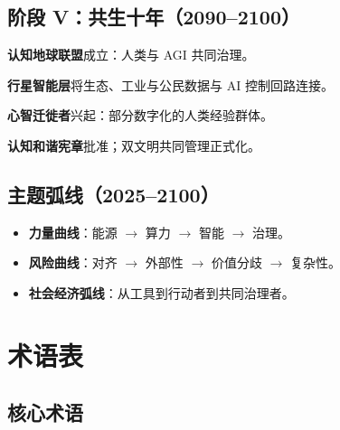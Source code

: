 \documentclass[11pt]{article}
\begin{document}
\subsection{阶段 V：共生十年（2090–2100）}
\begin{description}[style=nextline,leftmargin=2cm]
  \item[2092] \textbf{认知地球联盟}成立：人类与 AGI 共同治理。
  \item[2095] \textbf{行星智能层}将生态、工业与公民数据与 AI 控制回路连接。
  \item[2098] \textbf{心智迁徙者}兴起：部分数字化的人类经验群体。
  \item[2100] \textbf{认知和谐宪章}批准；双文明共同管理正式化。
\end{description}

\subsection{主题弧线（2025–2100）}
\begin{itemize}[noitemsep]
  \item \textbf{力量曲线}：能源 $\rightarrow$ 算力 $\rightarrow$ 智能 $\rightarrow$ 治理。
  \item \textbf{风险曲线}：对齐 $\rightarrow$ 外部性 $\rightarrow$ 价值分歧 $\rightarrow$ 复杂性。
  \item \textbf{社会经济弧线}：从工具到行动者到共同治理者。
\end{itemize}

\clearpage

\section*{术语表}

\subsection*{核心术语}
\end{document}
